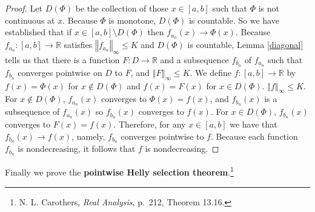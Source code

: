 \documentclass{article}
\newcommand{\norm}[1]{\left\Vert #1 \right\Vert}
\theoremstyle{definition}
\begin{document}
\begin{proof}
Let $D(\Phi)$ be the collection of those $x \in [a,b]$ such that $\Phi$ is not continuous at $x$. Because $\Phi$ is monotone, $D(\Phi)$ is countable. 
So we have established that if $x \in [a,b] \setminus D(\Phi)$ then $f_{a_n}(x) \to \Phi(x)$. 
Because  $f_{a_n}:[a,b] \to \mathbb{R}$ satisfies $\norm{f_{a_n}}_\infty \leq K$ and $D(\Phi)$ is countable,
Lemma \ref{diagonal} tells us that there is a function $F:D \to \mathbb{R}$ and a subsequence
$f_{b_n}$ of $f_{a_n}$ such that $f_{b_n}$ converges pointwise on $D$ to $F$, and $\norm{F}_\infty \leq K$. 
We define $f:[a,b] \to \mathbb{R}$ by $f(x)=\Phi(x)$ for $x \not \in D(\Phi)$ and $f(x)=F(x)$ for $x \in D(\Phi)$. $\norm{f}_\infty \leq K$. For $x \not \in
D(\Phi)$, $f_{a_n}(x)$ converges to $\Phi(x)=f(x)$, and $f_{b_n}(x)$ is a subsequence of $f_{a_n}(x)$ so $f_{b_n}(x)$ converges to
$f(x)$. For $x \in D(\Phi)$, $f_{b_n}(x)$ converges to $F(x)=f(x)$.  Therefore, for any $x \in [a,b]$ we have that
$f_{b_n}(x) \to f(x)$, namely, $f_{b_n}$ converges pointwise to $f$. Because each function $f_{b_n}$ is nondecreasing, it follows that $f$ is nondecreasing.
\end{proof}


Finally we prove the \textbf{pointwise Helly selection theorem}.\footnote{N. L. Carothers, {\em Real Analysis}, p.~212, Theorem 13.16.}
\end{document}
